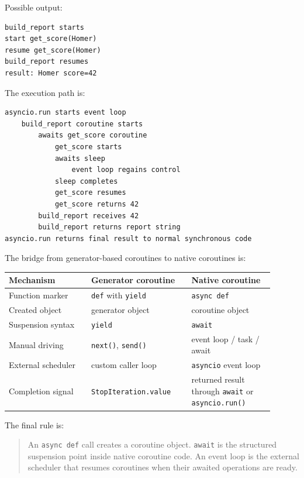Possible output:

\begin{verbatim}
build_report starts
start get_score(Homer)
resume get_score(Homer)
build_report resumes
result: Homer score=42
\end{verbatim}

The execution path is:

\begin{verbatim}
asyncio.run starts event loop
    build_report coroutine starts
        awaits get_score coroutine
            get_score starts
            awaits sleep
                event loop regains control
            sleep completes
            get_score resumes
            get_score returns 42
        build_report receives 42
        build_report returns report string
asyncio.run returns final result to normal synchronous code
\end{verbatim}

The bridge from generator-based coroutines to native coroutines is:

\begin{center}
\begin{tabular}{|p{0.28\linewidth}|p{0.34\linewidth}|p{0.28\linewidth}|}
\hline
\textbf{Mechanism} & \textbf{Generator coroutine} & \textbf{Native coroutine} \\
\hline
Function marker & \texttt{def} with \texttt{yield} & \texttt{async def} \\
\hline
Created object & generator object & coroutine object \\
\hline
Suspension syntax & \texttt{yield} & \texttt{await} \\
\hline
Manual driving & \texttt{next()}, \texttt{send()} & event loop / task / await \\
\hline
External scheduler & custom caller loop & \texttt{asyncio} event loop \\
\hline
Completion signal & \texttt{StopIteration.value} & returned result through \texttt{await} or \texttt{asyncio.run()} \\
\hline
\end{tabular}
\end{center}

The final rule is:

\begin{quote}
An \texttt{async def} call creates a coroutine object. \texttt{await} is the structured suspension point inside native coroutine code. An event loop is the external scheduler that resumes coroutines when their awaited operations are ready.
\end{quote}